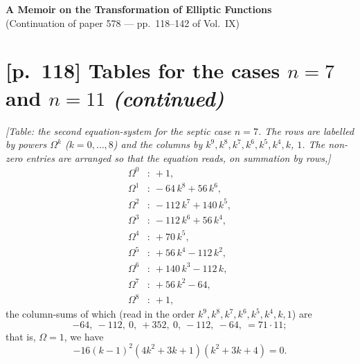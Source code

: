 \documentclass[11pt]{article}
\begin{document}
\begin{center}
{\Large\bfseries A Memoir on the Transformation of Elliptic Functions}\\[4pt]
{\small (Continuation of paper 578 --- pp.\ 118--142 of Vol.\ IX)}
\end{center}

\section*{[p.~118] Tables for the cases $n=7$ and $n=11$ \emph{(continued)}}

\textit{[Table: the second equation-system for the septic case $n=7$. The
rows are labelled by powers $\Omega^k$ ($k=0,\ldots,8$) and the columns by
$k^9, k^8, k^7, k^6, k^5, k^4, k$, $1$. The non-zero entries are arranged so
that the equation reads, on summation by rows,]}
\[
\begin{aligned}
\Omega^0 &: \ +1, \\
\Omega^1 &: \ -64\,k^8 + 56\,k^6, \\
\Omega^2 &: \ -112\,k^7 + 140\,k^5, \\
\Omega^3 &: \ -112\,k^6 + 56\,k^4, \\
\Omega^4 &: \ +70\,k^5, \\
\Omega^5 &: \ +56\,k^4 - 112\,k^2, \\
\Omega^6 &: \ +140\,k^3 - 112\,k, \\
\Omega^7 &: \ +56\,k^2 - 64, \\
\Omega^8 &: \ +1,
\end{aligned}
\]
the column-sums of which (read in the order $k^9,k^8,k^7,k^6,k^5,k^4,k,1$)
are
\[
-64,\ -112,\ 0,\ +352,\ 0,\ -112,\ -64,\ =71\cdot 11;
\]
that is, $\Omega=1$, we have
\[
-16(k-1)^2(4k^2+3k+1)(k^2+3k+4)=0.
\]
\end{document}
